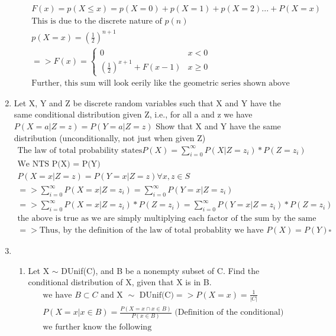 \documentclass[11pt]{article}
\begin{document}
\begin{enumerate}
\begin{enumerate}
	\begin{gather}
		F(x) = p(X\leq x) = p(X=0) + p(X=1) + p(X=2) ... + P(X=x) \\
		\text{This is due to the discrete nature of $p(n)$} \\
		p(X=x) = (\frac{1}{2})^{n+1}\\
		=> F(x) = 
		\begin{cases}
			0 & x<0 \\
			(\frac{1}{2})^{x+1} + F(x-1) & x \geq 0
		\end{cases}
		\\
		\text{Further, this sum will look eerily like the geometric series shown above} 		
	\end{gather}
\end{enumerate}
\item Let X, Y and Z be discrete random variables such that X and Y have the same conditional distribution given
Z, i.e., for all a and z we have
$P(X = a | Z = z) = P(Y = a | Z = z)$
Show that X and Y have the same distribution (unconditionally, not just when given Z)
\begin{gather}
	\text{The law of total probability states} P(X) = \sum_{i=0}^{\infty}P(X|Z=z_i) * P(Z=z_i)\\
	\text{We NTS P(X) = P(Y)}\\
	P(X=x|Z=z) = P(Y=x|Z=z) \forall x,z \in S \\
	=> \sum_{i=0}^{\infty} P(X=x|Z=z_i) = \sum_{i=0}^{\infty} P(Y=x|Z=z_i) \\
	=>\sum_{i=0}^{\infty} P(X=x|Z=z_i)*P(Z=z_i) = \sum_{i=0}^{\infty} P(Y=x|Z=z_i)*P(Z=z_i) \\
	\text{the above is true as we are simply multiplying each factor of the sum by the same value on both sides}\\
	=> \text{Thus, by the definition of the law of total probablity we have }  P(X) = P(Y) \square
\end{gather}
\item
\begin{enumerate}
	\item Let X $\sim$ DUnif(C), and B be a nonempty subset of C. Find the conditional distribution of X, given
	that X is in B.
	\begin{gather}
		\text{we have $B\subset C$ and X $\sim$ DUnif(C)} => P(X=x) = \frac{1}{|C|}\\
		P(X=x|x\in B) = \frac{P(X=x \cap x \in B)}{P(x\in B)} \text{ (Definition of the conditional)}\\
		\text{we further know the following}\\

\end{gather}
\end{enumerate}
\end{enumerate}
\end{document}
